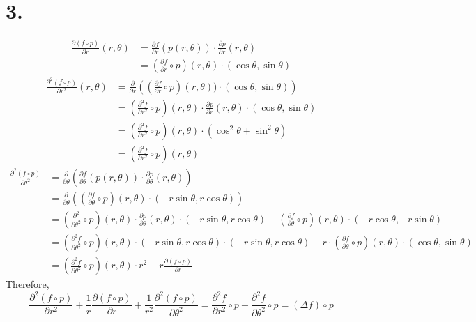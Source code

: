 \documentclass[11pt]{article}
\begin{document}
\section*{3.}
\begin{equation*}
\begin{aligned}
\frac{\partial (f \circ p)}{\partial r}(r,\theta) &= \frac{\partial f}{\partial r}(p(r,\theta)) \cdot \frac{\partial p}{\partial r} (r,\theta) \\
&= \left( \frac{\partial f}{\partial r} \circ p \right)(r,\theta) \cdot (\cos\theta, \sin\theta)
\end{aligned}
\end{equation*}
\begin{equation*}
\begin{aligned}
\frac{\partial^2 (f \circ p)}{\partial r^2}(r,\theta) &= \frac{\partial}{\partial r} \left( \left(\frac{\partial f}{\partial r} \circ p \right)(r,\theta)) \cdot (\cos\theta, \sin\theta) \right) \\
&= \left(\frac{\partial^2 f}{\partial r^2} \circ p \right) (r,\theta) \cdot \frac{\partial p}{\partial r}(r, \theta) \cdot (\cos\theta, \sin\theta) \\
&= \left(\frac{\partial^2 f}{\partial r^2} \circ p \right) (r,\theta) \cdot (\cos^2\theta + \sin^2 \theta) \\
&= \left(\frac{\partial^2 f}{\partial r^2} \circ p \right) (r,\theta)
\end{aligned}
\end{equation*}
\begin{equation*}
\begin{aligned}
\frac{\partial^2 (f\circ p)}{\partial \theta^2} &= \frac{\partial}{\partial \theta} \left( \frac{\partial f}{\partial \theta} (p(r,\theta)) \cdot \frac{\partial p}{\partial \theta}(r,\theta) \right) \\
&= \frac{\partial}{\partial \theta} \left( \left(\frac{\partial f}{\partial \theta} \circ p \right) (r,\theta) \cdot (-r\sin\theta, r\cos\theta) \right) \\
&= \left( \frac{\partial^2}{\partial \theta^2} \circ p \right)(r,\theta) \cdot \frac{\partial p}{\partial \theta}(r,\theta) \cdot (-r\sin\theta, r\cos\theta) + \left( \frac{\partial f}{\partial \theta} \circ p \right) (r, \theta) \cdot (-r\cos\theta, -r \sin\theta) \\
&= \left( \frac{\partial^2 f}{\partial \theta^2} \circ p \right)(r,\theta) \cdot (-r\sin\theta, r\cos\theta) \cdot (-r\sin\theta, r\cos\theta) -r \cdot \left( \frac{\partial f}{\partial \theta} \circ p \right) (r, \theta) \cdot (\cos\theta, \sin\theta) \\
&= \left( \frac{\partial^2 f}{\partial \theta^2} \circ p \right)(r,\theta) \cdot r^2 -r \frac{\partial (f \circ p)}{\partial r}
\end{aligned}
\end{equation*}
Therefore, 
\[
\frac{\partial^2 (f \circ p)}{\partial r^2} + \frac{1}{r} \frac{\partial (f \circ p)}{\partial r} + \frac{1}{r^2} \frac{\partial^2 (f\circ p)}{\partial \theta^2} = \frac{\partial^2 f}{\partial r^2} \circ p + \frac{\partial^2 f}{\partial \theta^2} \circ p = (\Delta f) \circ p
\]
\pagebreak
\end{document}
